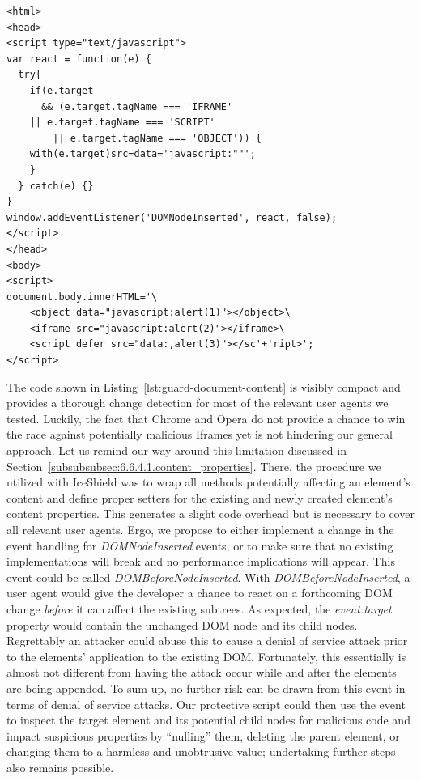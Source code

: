 \begin{lstlisting}[captionpos=b,label=lst:guard-document-content,caption=Example code to show how JavaScript URIs in Iframes and similar elements can be handled safely]
<html>
<head>
<script type="text/javascript">
var react = function(e) {
  try{
    if(e.target 
      && (e.target.tagName === 'IFRAME'
	|| e.target.tagName === 'SCRIPT'
        || e.target.tagName === 'OBJECT')) {
	with(e.target)src=data='javascript:""';
    }
  } catch(e) {}	
}
window.addEventListener('DOMNodeInserted', react, false);
</script>
</head>
<body>
<script>
document.body.innerHTML='\
    <object data="javascript:alert(1)"></object>\
    <iframe src="javascript:alert(2)"></iframe>\
    <script defer src="data:,alert(3)"></sc'+'ript>';
</script>
\end{lstlisting}

    The code shown in Listing~\ref{lst:guard-document-content} is visibly compact and provides a thorough change detection for most of the relevant user agents we tested. Luckily, the fact that Chrome and Opera do not provide a chance to win the race against potentially malicious Iframes yet is not hindering our general approach. Let us remind our way around this limitation discussed in Section~\ref{subsubsubsec:6.6.4.1.content_properties}. There, the procedure we utilized with IceShield was to wrap all methods potentially affecting an element's content and define proper setters for the existing and newly created element's content properties. This generates a slight code overhead but is necessary to cover all relevant user agents. Ergo, we propose to either implement a change in the event handling for \textit{DOMNodeInserted} events, or to make sure that no existing implementations will break and no performance implications will appear. This event could be called \textit{DOMBeforeNodeInserted}. With \textit{DOMBeforeNodeInserted}, a user agent would give the developer a chance to react on a forthcoming DOM change \textit{before} it can affect the existing subtrees. As expected, the \textit{event.target} property would contain the unchanged DOM node and its child nodes. Regrettably an attacker could abuse this to cause a denial of service attack prior to the elements' application to the existing DOM. Fortunately, this essentially is almost not different from having the attack occur while and after the elements are being appended. To sum up, no further risk can be drawn from this event in terms of denial of service attacks. Our protective script could then use the event to inspect the target element and its potential child nodes for malicious code and impact suspicious properties by ``nulling'' them, deleting the parent element, or changing them to a harmless and unobtrusive value; undertaking further steps also remains possible.\\

